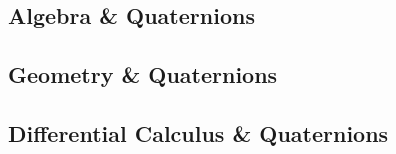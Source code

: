 \subsection{Algebra \& Quaternions}

\subsection{Geometry \& Quaternions}

\subsection{Differential Calculus \& Quaternions}
